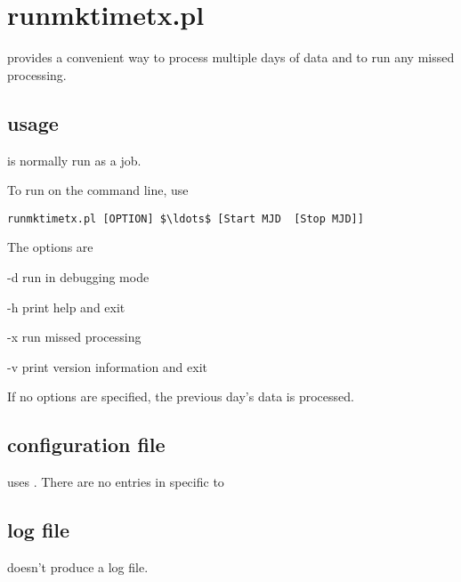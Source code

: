
\section{runmktimetx.pl \label{runmktimetx}}

 provides a convenient way to process multiple days of data and to run any missed processing.

	
\subsection{usage}
 is normally run as a  job.

To run  on the command line, use
\begin{lstlisting}[mathescape=true]
runmktimetx.pl [OPTION] $\ldots$ [Start MJD  [Stop MJD]]
\end{lstlisting}

The options are
\begin{description*}
	\item[-d]	run in debugging mode
	\item[-h]	print help and exit
	\item[-x] run missed processing
	\item[-v]	print version information and exit
\end{description*}

If no options are specified, the previous day's data is processed.

\subsection{configuration file}
 uses . There are no entries in  specific to 

\subsection{log file}
 doesn't produce a log file.